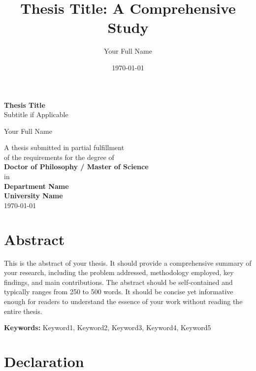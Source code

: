 \documentclass[12pt, oneside]{book}
\title{Thesis Title: A Comprehensive Study}
\author{Your Full Name}
\date{\today}
\theoremstyle{definition}
\theoremstyle{remark}
\begin{document}

\frontmatter

\begin{titlepage}
    \centering
    \vspace*{2cm}
    
    {\LARGE\textbf{Thesis Title}\\[0.5cm]}
    {\large Subtitle if Applicable\\[2cm]}
    
    {\Large Your Full Name\\[1cm]}
    
    \vfill
    
    {\large A thesis submitted in partial fulfillment\\
    of the requirements for the degree of\\[0.5cm]
    \textbf{Doctor of Philosophy / Master of Science}\\[1cm]
    
    in\\[0.5cm]
    
    \textbf{Department Name}\\
    \textbf{University Name}\\[1cm]
    
    \today}
\end{titlepage}

\chapter*{Abstract}

This is the abstract of your thesis. It should provide a comprehensive summary of 
your research, including the problem addressed, methodology employed, key findings, 
and main contributions. The abstract should be self-contained and typically ranges 
from 250 to 500 words. It should be concise yet informative enough for readers to 
understand the essence of your work without reading the entire thesis.

\textbf{Keywords:} Keyword1, Keyword2, Keyword3, Keyword4, Keyword5

\chapter*{Declaration}
\end{document}
